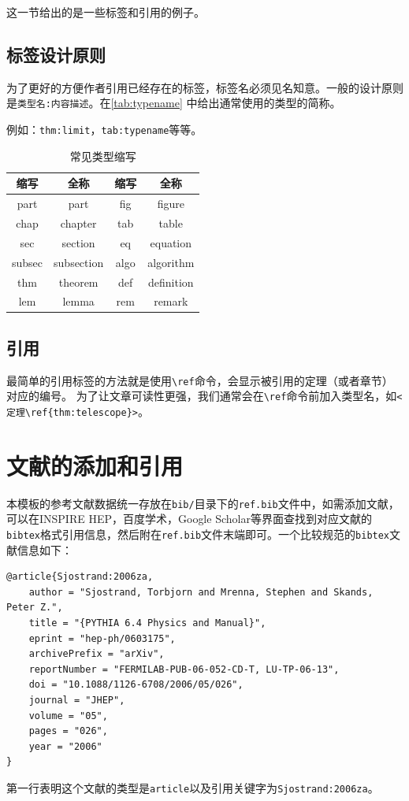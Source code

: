 这一节给出的是一些标签和引用的例子。

\subsection{标签设计原则}

为了更好的方便作者引用已经存在的标签，标签名必须见名知意。一般的设计原则是\verb|类型名:内容描述|。在\autoref{tab:typename} 中给出通常使用的类型的简称。

例如：\verb|thm:limit|，\verb|tab:typename|等等。

\begin{table}[!htp]
	\centering
	\caption{常见类型缩写}
	\begin{tabular}{c|c|c|c}\label{tab:typename}
		缩写 & 全称 & 缩写 & 全称 \\
		\hline
		part & part & fig & figure \\
		chap & chapter & tab & table \\
		sec & section & eq & equation \\
		subsec & subsection & algo & algorithm \\
		thm & theorem & def & definition \\
		lem & lemma & rem & remark \\
	\end{tabular}
\end{table}

\subsection{引用}

最简单的引用标签的方法就是使用\verb|\ref|命令，会显示被引用的定理（或者章节）对应的编号。
为了让文章可读性更强，我们通常会在\verb|\ref|命令前加入类型名，如\verb|<定理\ref{thm:telescope}>|。

\section{文献的添加和引用}

本模板的参考文献数据统一存放在\verb|bib/|目录下的\verb|ref.bib|文件中，如需添加文献，可以在INSPIRE HEP，百度学术，Google Scholar等界面查找到对应文献的\verb|bibtex|格式引用信息，然后附在\verb|ref.bib|文件末端即可。一个比较规范的\verb|bibtex|文献信息如下：
\begin{lstlisting}
@article{Sjostrand:2006za,
    author = "Sjostrand, Torbjorn and Mrenna, Stephen and Skands, Peter Z.",
    title = "{PYTHIA 6.4 Physics and Manual}",
    eprint = "hep-ph/0603175",
    archivePrefix = "arXiv",
    reportNumber = "FERMILAB-PUB-06-052-CD-T, LU-TP-06-13",
    doi = "10.1088/1126-6708/2006/05/026",
    journal = "JHEP",
    volume = "05",
    pages = "026",
    year = "2006"
}
\end{lstlisting}
第一行表明这个文献的类型是\verb|article|以及引用关键字为\verb|Sjostrand:2006za|。

